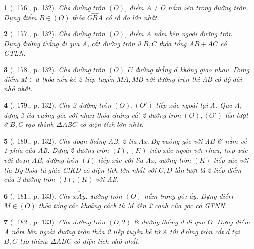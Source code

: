 \documentclass{article}
\newtheorem{baitoan}{}
\begin{document}
\begin{baitoan}[\cite{Binh_Toan_9_tap_1}, 176., p. 132]
	Cho đường tròn $(O)$, điểm $A\ne O$ nằm bên trong đường tròn. Dựng điểm $B\in(O)$ thỏa $\widehat{OBA}$ có số đo lớn nhất.
\end{baitoan}

\begin{baitoan}[\cite{Binh_Toan_9_tap_1}, 177., p. 132]
	Cho đường tròn $(O)$, điểm A nằm bên ngoài đường tròn. Dựng đường thẳng đi qua A, cắt đường tròn ở $B,C$ thỏa tổng $AB + AC$ có {\rm GTLN}.
\end{baitoan}

\begin{baitoan}[\cite{Binh_Toan_9_tap_1}, 178., p. 132]
	Cho đường tròn $(O)$ \& đường thẳng $d$ không giao nhau. Dựng điểm $M\in d$ thỏa nếu  kẻ 2 tiếp tuyến $MA,MB$ với đường tròn thì AB có độ dài nhỏ nhất.
\end{baitoan}

\begin{baitoan}[\cite{Binh_Toan_9_tap_1}, 179., p. 132]
	Cho 2 đường tròn $(O),(O')$ tiếp xúc ngoài tại A. Qua A, dựng 2 tia vuông góc với nhau thỏa chúng cắt 2 đường tròn $(O),(O')$ lần lượt ở $B,C$ tạo thành $\Delta ABC$ có diện tích lớn nhất.
\end{baitoan}

\begin{baitoan}[\cite{Binh_Toan_9_tap_1}, 180., p. 132]
	Cho đoạn thẳng AB, 2 tia $Ax,By$ vuông góc với AB \& nằm về 1 phía của AB. Dựng 2 đường tròn $(I),(K)$ tiếp xúc ngoài với nhau, tiếp xúc với đoạn AB, đường tròn $(I)$ tiếp xúc với tia Ax, đường tròn $(K)$ tiếp xúc với tia By thỏa tứ giác CIKD có diện tích lớn nhất với $C,D$ lần lượt là 2 tiếp điểm của 2 đường tròn $(I),(K)$ với AB.
\end{baitoan}

\begin{baitoan}[\cite{Binh_Toan_9_tap_1}, 181., p. 133]
	Cho $\widehat{xAy}$, đường tròn $(O)$ nằm trong góc ấy. Dựng điểm $M\in(O)$ thỏa tổng các khoảng cách từ M đến 2 cạnh của góc có {\rm GTNN}.
\end{baitoan}

\begin{baitoan}[\cite{Binh_Toan_9_tap_1}, 182., p. 133]
	Cho đường tròn $(O,2)$ \& đường thẳng $d$ đi qua O. Dựng điểm A nằm bên ngoài đường tròn thỏa 2 tiếp tuyến kẻ từ A tới đường tròn cắt $d$ tại $B,C$ tạo thành $\Delta ABC$ có diện tích nhỏ nhất.
\end{baitoan}
\end{document}
